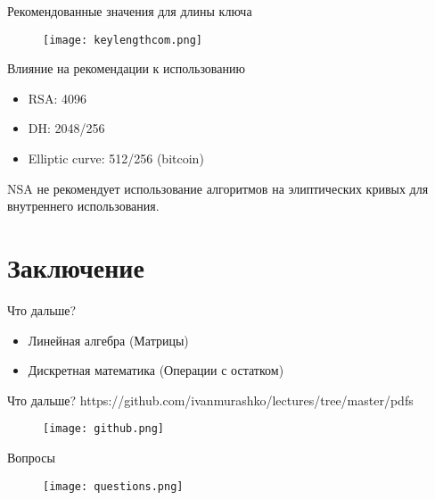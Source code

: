 \documentclass[10pt,pdf,hyperref={unicode}]{beamer}
\begin{document}
\begin{frame}{Рекомендованные значения для длины ключа}
 \begin{figure} 
   \texttt{[image: keylengthcom.png]}
  \end{figure}
\end{frame}

\begin{frame}{Влияние на рекомендации к использованию}
\begin{itemize}
\item RSA: 4096
\item DH: 2048/256
\item Elliptic curve: 512/256 (bitcoin) 
\end{itemize}

NSA не рекомендует использование алгоритмов на элиптических кривых для
внутреннего использования.
\end{frame}

\section{Заключение}
\begin{frame}{Что дальше?}
\begin{itemize}
\item Линейная алгебра (Матрицы)
\item Дискретная математика (Операции с остатком)
\end{itemize}
\end{frame}

\begin{frame}{Что дальше?}
https://github.com/ivanmurashko/lectures/tree/master/pdfs
 \begin{figure} 
   \texttt{[image: github.png]}
  \end{figure}
\end{frame}

\begin{frame}{Вопросы}
 \begin{figure} 
   \texttt{[image: questions.png]}
  \end{figure}
\end{frame}
\end{document}
